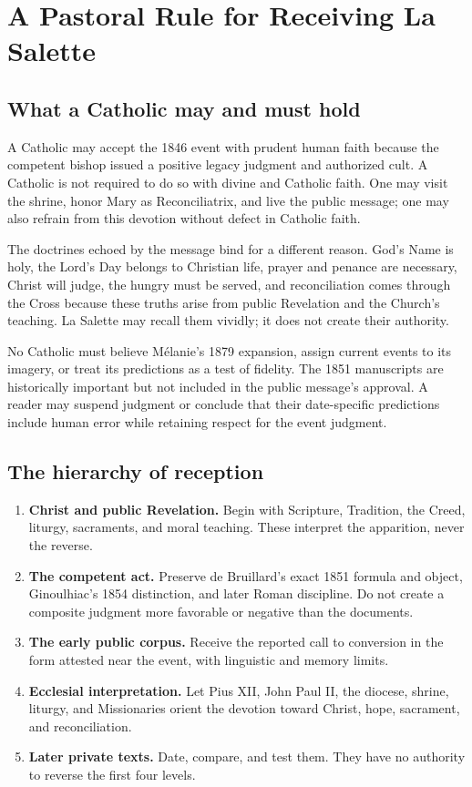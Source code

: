 \section{A Pastoral Rule for Receiving La Salette}

\subsection{What a Catholic may and must hold}

A Catholic may accept the 1846 event with prudent human faith because the competent bishop issued a positive legacy judgment and authorized cult. A Catholic is not required to do so with divine and Catholic faith. One may visit the shrine, honor Mary as Reconciliatrix, and live the public message; one may also refrain from this devotion without defect in Catholic faith.

The doctrines echoed by the message bind for a different reason. God's Name is holy, the Lord's Day belongs to Christian life, prayer and penance are necessary, Christ will judge, the hungry must be served, and reconciliation comes through the Cross because these truths arise from public Revelation and the Church's teaching. La Salette may recall them vividly; it does not create their authority.

No Catholic must believe Mélanie's 1879 expansion, assign current events to its imagery, or treat its predictions as a test of fidelity. The 1851 manuscripts are historically important but not included in the public message's approval. A reader may suspend judgment or conclude that their date-specific predictions include human error while retaining respect for the event judgment.

\subsection{The hierarchy of reception}

\begin{enumerate}
  \item \textbf{Christ and public Revelation.} Begin with Scripture, Tradition, the Creed, liturgy, sacraments, and moral teaching. These interpret the apparition, never the reverse.
  \item \textbf{The competent act.} Preserve de Bruillard's exact 1851 formula and object, Ginoulhiac's 1854 distinction, and later Roman discipline. Do not create a composite judgment more favorable or negative than the documents.
  \item \textbf{The early public corpus.} Receive the reported call to conversion in the form attested near the event, with linguistic and memory limits.
  \item \textbf{Ecclesial interpretation.} Let Pius XII, John Paul II, the diocese, shrine, liturgy, and Missionaries orient the devotion toward Christ, hope, sacrament, and reconciliation.
  \item \textbf{Later private texts.} Date, compare, and test them. They have no authority to reverse the first four levels.
\end{enumerate}

